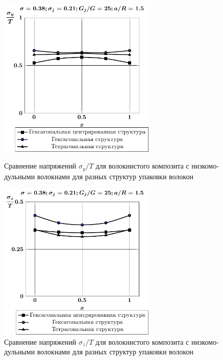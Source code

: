 \begin{russian}
%

\begin{figure}[h!]
\centering\footnotesize
\parbox[b]{7.5cm}{\centering\includegraphics[width=7.5cm]{inc7-6-4-sig_y.pdf}
\caption{Сравнение напряжений $\sigma_y/T$ для волокнистого композита с низкомодульными волокнами для разных структур упаковки волокон
\label{f:7:72}}}\hfil\hfil
\parbox[b]{7.5cm}{\centering\includegraphics[width=7.5cm]{inc7-6-4-sig_z.pdf}
\caption{Сравнение напряжений $\sigma_z/T$ для волокнистого композита с низкомодульными волокнами для разных структур упаковки волокон
\label{f:7:73}}}
\end{figure}


\end{russian}

